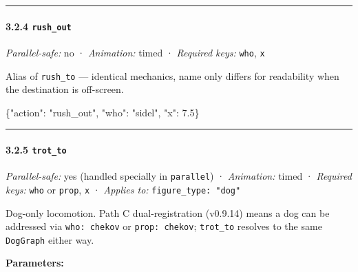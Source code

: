 \documentclass[
  12pt,
  letterpaper,
]{book}
\newenvironment{Shaded}{}{}
\newcommand{\DataTypeTok}[1]{\textcolor[rgb]{0.56,0.13,0.00}{#1}}
\newcommand{\FloatTok}[1]{\textcolor[rgb]{0.25,0.63,0.44}{#1}}
\newcommand{\FunctionTok}[1]{\textcolor[rgb]{0.02,0.16,0.49}{#1}}
\newcommand{\StringTok}[1]{\textcolor[rgb]{0.25,0.44,0.63}{#1}}
\begin{document}
\begin{center}\rule{0.5\linewidth}{0.5pt}\end{center}

\paragraph{\texorpdfstring{3.2.4
\texttt{rush\_out}}{3.2.4 rush\_out}}\label{rush_out}

\emph{Parallel-safe:} no · \emph{Animation:} timed · \emph{Required
keys:} \texttt{who}, \texttt{x}

Alias of \texttt{rush\_to} --- identical mechanics, name only differs
for readability when the destination is off-screen.

\begin{Shaded}
\begin{Highlighting}[]
\FunctionTok{\{}\DataTypeTok{"action"}\FunctionTok{:} \StringTok{"rush\_out"}\FunctionTok{,} \DataTypeTok{"who"}\FunctionTok{:} \StringTok{"sidel"}\FunctionTok{,} \DataTypeTok{"x"}\FunctionTok{:} \FloatTok{7.5}\FunctionTok{\}}
\end{Highlighting}
\end{Shaded}

\begin{center}\rule{0.5\linewidth}{0.5pt}\end{center}

\paragraph{\texorpdfstring{3.2.5
\texttt{trot\_to}}{3.2.5 trot\_to}}\label{trot_to}

\emph{Parallel-safe:} yes (handled specially in \texttt{parallel}) ·
\emph{Animation:} timed · \emph{Required keys:} \texttt{who} or
\texttt{prop}, \texttt{x} · \emph{Applies to:}
\texttt{figure\_type:\ "dog"}

Dog-only locomotion. Path C dual-registration (v0.9.14) means a dog can
be addressed via \texttt{who:\ chekov} or \texttt{prop:\ chekov};
\texttt{trot\_to} resolves to the same \texttt{DogGraph} either way.

\textbf{Parameters:}
\end{document}

